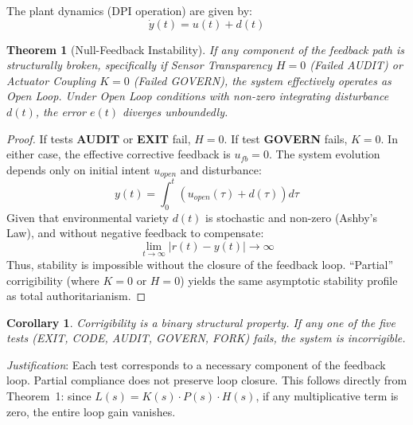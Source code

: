 \documentclass{article}
\newtheorem{theorem}{Theorem}
\newtheorem{corollary}{Corollary}
\begin{document}
The plant dynamics (DPI operation) are given by:
\begin{equation}
\dot{y}(t) = u(t) + d(t)
\end{equation}

\begin{theorem}[Null-Feedback Instability]
If any component of the feedback path is structurally broken, specifically if Sensor Transparency $H=0$ (Failed AUDIT) or Actuator Coupling $K=0$ (Failed GOVERN), the system effectively operates as Open Loop. Under Open Loop conditions with non-zero integrating disturbance $d(t)$, the error $e(t)$ diverges unboundedly.
\end{theorem}

\begin{proof}
If tests \textbf{AUDIT} or \textbf{EXIT} fail, $H=0$.
If test \textbf{GOVERN} fails, $K=0$.
In either case, the effective corrective feedback is $u_{fb} = 0$.
The system evolution depends only on initial intent $u_{open}$ and disturbance:
\begin{equation}
y(t) = \int_0^t (u_{open}(\tau) + d(\tau)) d\tau
\end{equation}
Given that environmental variety $d(t)$ is stochastic and non-zero (Ashby's Law), and without negative feedback to compensate:
\begin{equation}
\lim_{t \to \infty} |r(t) - y(t)| \to \infty
\end{equation}
Thus, stability is impossible without the closure of the feedback loop. ``Partial'' corrigibility (where $K=0$ or $H=0$) yields the same asymptotic stability profile as total authoritarianism.
\end{proof}

\begin{corollary}
Corrigibility is a binary structural property. If any one of the five tests (EXIT, CODE, AUDIT, GOVERN, FORK) fails, the system is incorrigible.
\end{corollary}

\textit{Justification}: Each test corresponds to a necessary component of the feedback loop. Partial compliance does not preserve loop closure. This follows directly from Theorem~1: since $L(s) = K(s) \cdot P(s) \cdot H(s)$, if any multiplicative term is zero, the entire loop gain vanishes.
\end{document}
